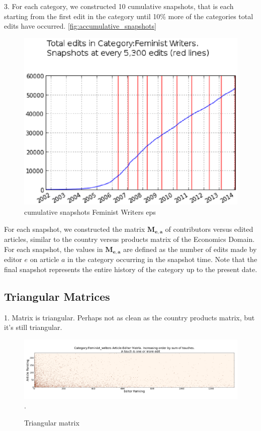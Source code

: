 \documentclass{acm_proc_article-sp}
\begin{document}
3. For each category, we constructed 10 cumulative snapshots, that is each starting from the first edit in the category until 10\% more of the categories total edits have occurred. \ref{fig:accumulative_snapshots}

\begin{figure}[!t]
\centering
\includegraphics[width=0.9\columnwidth]{Figures/cumulative_snapshots_Feminist_Writers.eps}
\caption{cumulative snapshots Feminist Writers eps }
\label{fig:figure1}
\end{figure}


For each snapshot, we constructed the matrix $\mathbf{M_{e,a}}$ of contributors versus edited articles, similar to the country versus products matrix of the Economics Domain. For each snapshot, the values in $\mathbf{M_{e,a}}$ are defined as the number of edits made by editor $e$ on article $a$ in the category occurring in the snapshot time. Note that the final snapshot represents the entire history of the category up to the present date. 

\subsection{Triangular Matrices}
1. Matrix is triangular.
Perhaps not as clean as the country products matrix, but it's still triangular.

\begin{figure}[!t]
\centering
\includegraphics[width=0.9\columnwidth]{Category:Feminist_writerstriangle_matrix_corrected.png}.
\caption{Triangular matrix}
\label{fig:triangle_matrix}
\end{figure}
\end{document}
